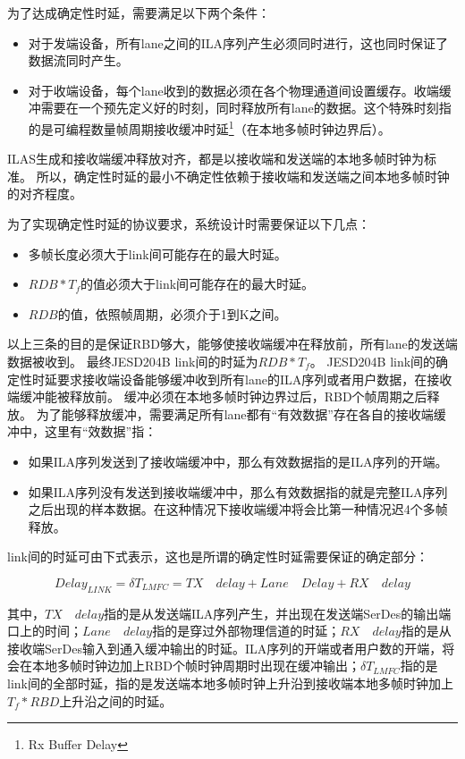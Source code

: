 \documentclass[UTF8]{ctexart}
\begin{document}
为了达成确定性时延，需要满足以下两个条件：

\begin{itemize}
\item 对于发端设备，所有lane之间的ILA序列产生必须同时进行，这也同时保证了数据流同时产生。
\item 对于收端设备，每个lane收到的数据必须在各个物理通道间设置缓存。收端缓冲需要在一个预先定义好的时刻，同时释放所有lane的数据。这个特殊时刻指的是可编程数量帧周期接收缓冲时延\footnote{Rx Buffer Delay}（在本地多帧时钟边界后）。
\end{itemize}

ILAS生成和接收端缓冲释放对齐，都是以接收端和发送端的本地多帧时钟为标准。
所以，确定性时延的最小不确定性依赖于接收端和发送端之间本地多帧时钟的对齐程度。

为了实现确定性时延的协议要求，系统设计时需要保证以下几点：

\begin{itemize}
\item 多帧长度必须大于link间可能存在的最大时延。
\item $RDB * T_f$的值必须大于link间可能存在的最大时延。
\item $RDB$的值，依照帧周期，必须介于1到K之间。
\end{itemize}

以上三条的目的是保证RBD够大，能够使接收端缓冲在释放前，所有lane的发送端数据被收到。
最终JESD204B link间的时延为$RDB * T_f$。
JESD204B link间的确定性时延要求接收端设备能够缓冲收到所有lane的ILA序列或者用户数据，在接收端缓冲能被释放前。
缓冲必须在本地多帧时钟边界过后，RBD个帧周期之后释放。
为了能够释放缓冲，需要满足所有lane都有“有效数据”存在各自的接收端缓冲中，这里有“效数据”指：

\begin{itemize}
\item 如果ILA序列发送到了接收端缓冲中，那么有效数据指的是ILA序列的开端。
\item 如果ILA序列没有发送到接收端缓冲中，那么有效数据指的就是完整ILA序列之后出现的样本数据。在这种情况下接收端缓冲将会比第一种情况迟4个多帧释放。
\end{itemize}

link间的时延可由下式表示，这也是所谓的确定性时延需要保证的确定部分：

$$Delay_{LINK} = \delta T_{LMFC} = TX \quad delay + Lane \quad Delay + RX \quad delay$$

其中，$TX \quad delay$指的是从发送端ILA序列产生，并出现在发送端SerDes的输出端口上的时间；$Lane \quad delay$指的是穿过外部物理信道的时延；$RX \quad delay$指的是从接收端SerDes输入到通入缓冲输出的时延。ILA序列的开端或者用户数的开端，将会在本地多帧时钟边加上RBD个帧时钟周期时出现在缓冲输出；$\delta T_{LMFC}$指的是link间的全部时延，指的是发送端本地多帧时钟上升沿到接收端本地多帧时钟加上$T_f * RBD$上升沿之间的时延。
\end{document}
